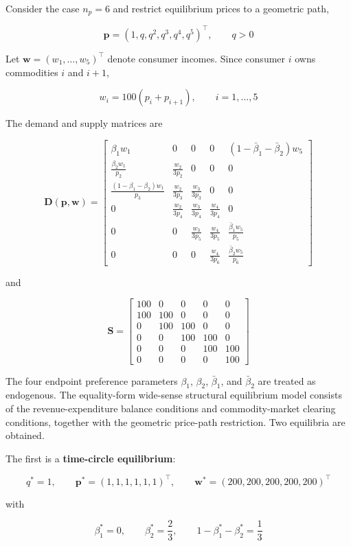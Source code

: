 \documentclass[
  letterpaper,
  DIV=11,
  numbers=noendperiod]{scrreprt}
\begin{document}
Consider the case \(n_p=6\) and restrict equilibrium prices to a
geometric path,

\[
\mathbf p=(1,q,q^2,q^3,q^4,q^5)^\top,\qquad q>0
\]

Let \(\mathbf w=(w_1,\ldots,w_5)^\top\) denote consumer incomes. Since
consumer \(i\) owns commodities \(i\) and \(i+1\),

\[
w_i=100(p_i+p_{i+1}),\qquad i=1,\ldots,5
\]

The demand and supply matrices are

\[
\mathbf D(\mathbf p,\mathbf w)=
\begin{bmatrix}
\beta_1 w_1
&0&0&0&(1-\bar\beta_1-\bar\beta_2)w_5\\
\frac{\beta_2w_1}{p_2}
&\frac{w_2}{3p_2}
&0&0&0\\
\frac{(1-\beta_1-\beta_2)w_1}{p_3}
&\frac{w_2}{3p_3}
&\frac{w_3}{3p_3}
&0&0\\
0
&\frac{w_2}{3p_4}
&\frac{w_3}{3p_4}
&\frac{w_4}{3p_4}
&0\\
0&0
&\frac{w_3}{3p_5}
&\frac{w_4}{3p_5}
&\frac{\bar\beta_1w_5}{p_5}\\
0&0&0
&\frac{w_4}{3p_6}
&\frac{\bar\beta_2w_5}{p_6}
\end{bmatrix}
\]

and

\[
\mathbf S=
\begin{bmatrix}
100&0&0&0&0\\
100&100&0&0&0\\
0&100&100&0&0\\
0&0&100&100&0\\
0&0&0&100&100\\
0&0&0&0&100
\end{bmatrix}
\]

The four endpoint preference parameters \(\beta_1\), \(\beta_2\),
\(\bar\beta_1\), and \(\bar\beta_2\) are treated as endogenous. The
equality-form wide-sense structural equilibrium model consists of the
revenue-expenditure balance conditions and commodity-market clearing
conditions, together with the geometric price-path restriction. Two
equilibria are obtained.

The first is a \textbf{time-circle equilibrium}:

\[
q^*=1,\qquad
\mathbf p^*=(1,1,1,1,1,1)^\top,\qquad
\mathbf w^*=(200,200,200,200,200)^\top
\]

with

\[
\beta_1^*=0,\qquad
\beta_2^*=\frac23,\qquad
1-\beta_1^*-\beta_2^*=\frac13
\]
\end{document}

